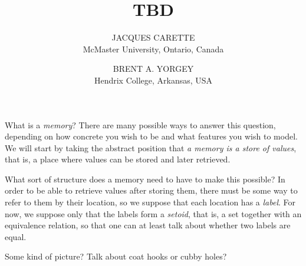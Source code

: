 \documentclass{jfp1}
\title{TBD}
\author[J. Carette and B. A. Yorgey]{JACQUES CARETTE\\
  McMaster University, Ontario, Canada \\
  \email{carette@mcmaster.ca}
  \and BRENT A. YORGEY\\
  Hendrix College, Arkansas, USA\\
  \email{yorgey@hendrix.edu}}
\newcommand{\term}[1]{\emph{#1}}
\begin{document}
\maketitle

What is a \term{memory}?  There are many possible ways to answer this
question, depending on how concrete you wish to be and what features
you wish to model.  We will start by taking the abstract position that
\emph{a memory is a store of values}, that is, a place where values
can be stored and later retrieved.

What sort of structure does a memory need to have to make this
possible?  In order to be able to retrieve values after storing them,
there must be some way to refer to them by their location, so we
suppose that each location has a \emph{label}.  For now, we suppose
only that the labels form a \term{setoid}, that is, a set together
with an equivalence relation, so that one can at least talk about
whether two labels are equal.


Some kind of picture?  Talk about coat hooks or cubby holes?
\end{document}
